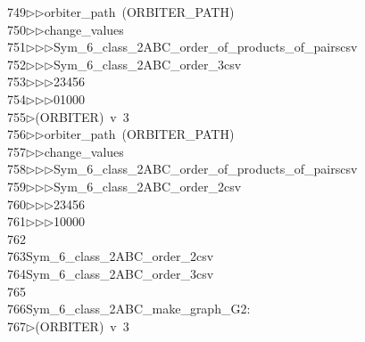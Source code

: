 \begin{tabbing}
749\>$\triangleright$\>$\triangleright$\>orbiter\_path\ (ORBITER\_PATH)\ \\[0pt]
750\>$\triangleright$\>$\triangleright$\>change\_values\ \\[0pt]
751\>$\triangleright$\>$\triangleright$\>$\triangleright$\>Sym\_6\_class\_2ABC\_order\_of\_products\_of\_pairscsv\ \\[0pt]
752\>$\triangleright$\>$\triangleright$\>$\triangleright$\>Sym\_6\_class\_2ABC\_order\_3csv\ \\[0pt]
753\>$\triangleright$\>$\triangleright$\>$\triangleright$23456\ \\[0pt]
754\>$\triangleright$\>$\triangleright$\>$\triangleright$01000\\[0pt]
755\>$\triangleright$\>(ORBITER)\ v\ 3\ \\[0pt]
756\>$\triangleright$\>$\triangleright$\>orbiter\_path\ (ORBITER\_PATH)\ \\[0pt]
757\>$\triangleright$\>$\triangleright$\>change\_values\ \\[0pt]
758\>$\triangleright$\>$\triangleright$\>$\triangleright$\>Sym\_6\_class\_2ABC\_order\_of\_products\_of\_pairscsv\ \\[0pt]
759\>$\triangleright$\>$\triangleright$\>$\triangleright$\>Sym\_6\_class\_2ABC\_order\_2csv\ \\[0pt]
760\>$\triangleright$\>$\triangleright$\>$\triangleright$23456\ \\[0pt]
761\>$\triangleright$\>$\triangleright$\>$\triangleright$10000\\[0pt]
762\>\\[0pt]
763\>Sym\_6\_class\_2ABC\_order\_2csv\\[0pt]
764\>Sym\_6\_class\_2ABC\_order\_3csv\\[0pt]
765\>\\[0pt]
766\>Sym\_6\_class\_2ABC\_make\_graph\_G2:\\[0pt]
767\>$\triangleright$\>(ORBITER)\ v\ 3\ \\[0pt]

\end{tabbing}
